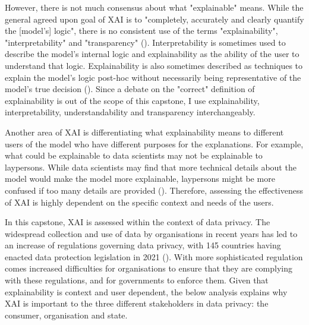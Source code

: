 However, there is not much consensus about what "explainable" means. While the general agreed upon goal of XAI is to "completely, accurately and clearly quantify the [model's] logic", there is no consistent use of the terms "explainability", "interpretability" and "transparency" (\cite{danilevsky2020}). Interpretability is sometimes used to describe the model's internal logic and explainability as the ability of the user to understand that logic. Explainability is also sometimes described as techniques to explain the model's logic post-hoc without necessarily being representative of the model's true decision (\cite{rosenfeld2021}). Since a debate on the "correct" definition of explainability is out of the scope of this capstone, I use explainability, interpretability, understandability and transparency interchangeably.

Another area of XAI is differentiating what explainability means to different users of the model who have different purposes for the explanations. For example, what could be explainable to data scientists may not be explainable to laypersons. While data scientists may find that more technical details about the model would make the model more explainable, laypersons might be more confused if too many details are provided (\cite{rosenfeld2021}). Therefore, assessing the effectiveness of XAI is highly dependent on the specific context and needs of the users. 

In this capstone, XAI is assessed within the context of data privacy. The widespread collection and use of data by organisations in recent years has led to an increase of regulations governing data privacy, with 145 countries having enacted data protection legislation in 2021 (\cite{gstrein2022}). With more sophisticated regulation comes increased difficulties for organisations to ensure that they are complying with these regulations, and for governments to enforce them. Given that explainability is context and user dependent, the below analysis explains why XAI is important to the three different stakeholders in data privacy: the consumer, organisation and state.

